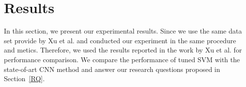 
\begin{table}[!htp]
\centering
\caption{Comparison of our baseline method with Xu et al's }
\label{tab:baseline}
\end{table}

\section{Results}
In this section, we present our experimental results. Since we use the same data set provide by Xu
et al.\cite{xu2016predicting} and conducted our experiment in the same procedure and metics. 
Therefore, we used the results reported in the work by Xu et al.\cite{xu2016predicting} for performance
comparison. We compare the performance of tuned SVM with the state-of-art CNN method and answer
our research questions proposed in Section~\ref{RQ}.

